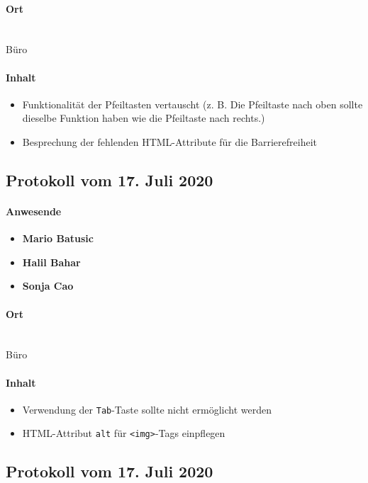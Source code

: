 \paragraph{Ort}\mbox{}\\
Büro

\paragraph{Inhalt}
\begin{itemize}
	\item Funktionalität der Pfeiltasten vertauscht (z. B. Die Pfeiltaste nach oben sollte dieselbe Funktion haben wie die Pfeiltaste nach rechts.)
	\item Besprechung der fehlenden HTML-Attribute für die Barrierefreiheit
\end{itemize}

\subsection{Protokoll vom 17. Juli 2020}
\paragraph{Anwesende}
\begin{itemize}
	\item{\textbf{Mario Batusic}}
	\item{\textbf{Halil Bahar}}
	\item{\textbf{Sonja Cao}}
\end{itemize}

\paragraph{Ort}\mbox{}\\
Büro

\paragraph{Inhalt}
\begin{itemize}
	\item Verwendung der \texttt{Tab}-Taste sollte nicht ermöglicht werden
	\item HTML-Attribut \texttt{alt} für \texttt{<img>}-Tags einpflegen	
\end{itemize}

\subsection{Protokoll vom 17. Juli 2020}
